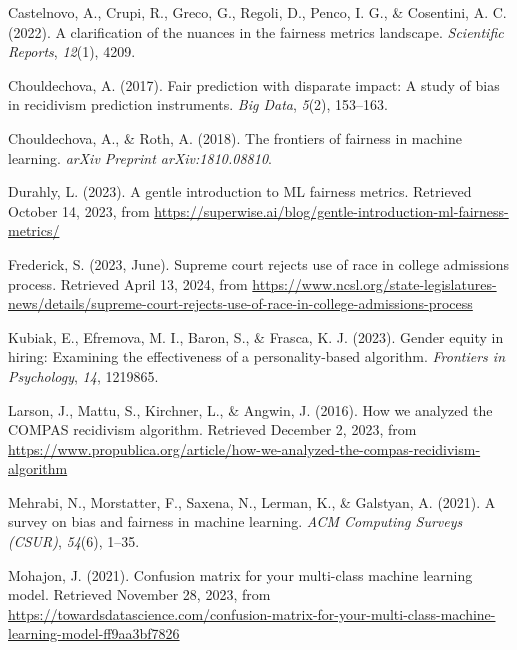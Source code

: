 \documentclass[12pt, twoside]{amherstthesis}
\newenvironment{CSLReferences}[2]%
  {}%
  {\par}
\begin{document}
\begin{CSLReferences}{1}{0}
\leavevmode{}%
Castelnovo, A., Crupi, R., Greco, G., Regoli, D., Penco, I. G., \& Cosentini, A. C. (2022). A clarification of the nuances in the fairness metrics landscape. \emph{Scientific Reports}, \emph{12}(1), 4209.

\leavevmode{}%
Chouldechova, A. (2017). Fair prediction with disparate impact: A study of bias in recidivism prediction instruments. \emph{Big Data}, \emph{5}(2), 153--163.

\leavevmode{}%
Chouldechova, A., \& Roth, A. (2018). The frontiers of fairness in machine learning. \emph{arXiv Preprint arXiv:1810.08810}.

\leavevmode{}%
Durahly, L. (2023). A gentle introduction to ML fairness metrics. Retrieved October 14, 2023, from \url{https://superwise.ai/blog/gentle-introduction-ml-fairness-metrics/}

\leavevmode{}%
Frederick, S. (2023, June). Supreme court rejects use of race in college admissions process. Retrieved April 13, 2024, from \url{https://www.ncsl.org/state-legislatures-news/details/supreme-court-rejects-use-of-race-in-college-admissions-process}

\leavevmode{}%
Kubiak, E., Efremova, M. I., Baron, S., \& Frasca, K. J. (2023). Gender equity in hiring: Examining the effectiveness of a personality-based algorithm. \emph{Frontiers in Psychology}, \emph{14}, 1219865.

\leavevmode{}%
Larson, J., Mattu, S., Kirchner, L., \& Angwin, J. (2016). How we analyzed the COMPAS recidivism algorithm. Retrieved December 2, 2023, from \url{https://www.propublica.org/article/how-we-analyzed-the-compas-recidivism-algorithm}

\leavevmode{}%
Mehrabi, N., Morstatter, F., Saxena, N., Lerman, K., \& Galstyan, A. (2021). A survey on bias and fairness in machine learning. \emph{ACM Computing Surveys (CSUR)}, \emph{54}(6), 1--35.

\leavevmode{}%
Mohajon, J. (2021). Confusion matrix for your multi-class machine learning model. Retrieved November 28, 2023, from \url{https://towardsdatascience.com/confusion-matrix-for-your-multi-class-machine-learning-model-ff9aa3bf7826}


\end{CSLReferences}
\end{document}

